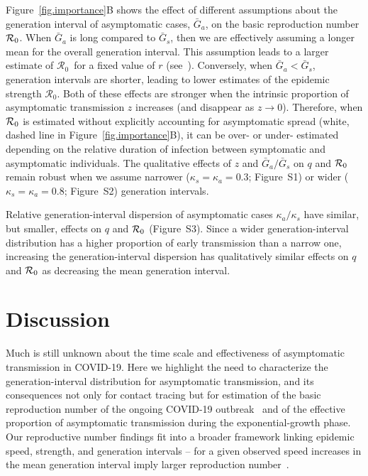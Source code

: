 \documentclass[12pt]{article}
\newcommand{\Ro}{\ensuremath{{\mathcal R}_{0}}\xspace}
\begin{document}
Figure~\ref{fig.importance}B shows the effect of different assumptions about the generation interval of asymptomatic cases, $\bar G_a$, on the basic reproduction number ${\cal{R}}_0$.
When $\bar G_a$ is long compared to $\bar G_s$, then we are effectively assuming a longer mean for the overall generation interval. 
This assumption leads to a larger estimate of \Ro\ for a fixed value of $r$ (see~\cite{park_2019practical}).
Conversely, when $\bar G_a < \bar G_s$, generation intervals are shorter, leading to lower estimates of the epidemic strength \Ro. Both of these effects are stronger when the intrinsic proportion of asymptomatic transmission $z$ increases (and disappear as $z\to0$).
Therefore, when ${\cal{R}}_0$ is estimated without explicitly accounting for asymptomatic spread (white, dashed line in Figure~\ref{fig.importance}B), it can be over- or under- estimated depending on the relative duration of infection between symptomatic and asymptomatic individuals.
The qualitative effects of $z$ and $\bar G_a/\bar G_s$ on $q$ and ${\cal{R}}_0$ remain robust when we assume narrower ($\kappa_s = \kappa_a = 0.3$; Figure~S1) or wider ($\kappa_s = \kappa_a = 0.8$; Figure~S2) generation intervals.

Relative generation-interval dispersion of asymptomatic cases $\kappa_a/\kappa_s$ have similar, but smaller, effects on $q$ and ${\cal{R}}_0$ (Figure~S3).
Since a wider generation-interval distribution has a higher proportion of early transmission than a narrow one, increasing the generation-interval dispersion has qualitatively similar effects on $q$ and ${\cal{R}}_0$ as decreasing the mean generation interval.

\section{Discussion}

Much is still unknown about the time scale and effectiveness of asymptomatic transmission in COVID-19.
Here we highlight the need to characterize the generation-interval distribution for asymptomatic transmission, and its consequences not only for contact tracing but for estimation of the basic reproduction number of the ongoing COVID-19 outbreak~\cite{park_preprint} and of the effective proportion of asymptomatic transmission during the exponential-growth phase.
Our reproductive number findings fit into a broader framework linking epidemic speed, strength, and generation intervals -- for a given observed speed increases in the mean generation interval imply larger reproduction number~\cite{wearing2005appropriate, roberts2007model, wallinga2007generation, powers2014impact, park_2019practical}.
\end{document}
